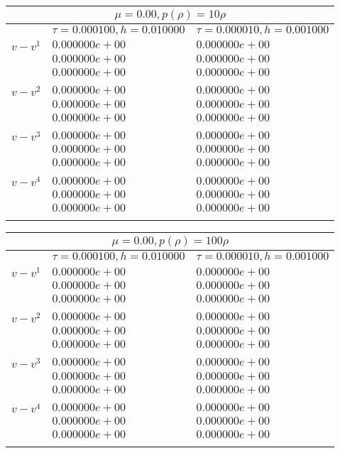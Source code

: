 \documentclass[12pt,a4paper]{article}
\begin{document}
\begin{tabular}{ |l|l|l|}
\hline
\multicolumn{3}{|c|}{$\mu = 0.00, p(\rho) = 10\rho$} \\
\hline
 &$\tau = 0.000100, h = 0.010000$ &$\tau = 0.000010, h = 0.001000$ \\
\hline
$v-v^{1}$& $0.000000e+00$ & $0.000000e+00$ \\
& $0.000000e+00$ & $0.000000e+00$ \\
& $0.000000e+00$ & $0.000000e+00$ \\
\\
\hline
$v-v^{2}$& $0.000000e+00$ & $0.000000e+00$ \\
& $0.000000e+00$ & $0.000000e+00$ \\
& $0.000000e+00$ & $0.000000e+00$ \\
\\
\hline
$v-v^{3}$& $0.000000e+00$ & $0.000000e+00$ \\
& $0.000000e+00$ & $0.000000e+00$ \\
& $0.000000e+00$ & $0.000000e+00$ \\
\\
\hline
$v-v^{4}$& $0.000000e+00$ & $0.000000e+00$ \\
& $0.000000e+00$ & $0.000000e+00$ \\
& $0.000000e+00$ & $0.000000e+00$ \\
\\
\hline
\end{tabular}

\begin{tabular}{ |l|l|l|}
\hline
\multicolumn{3}{|c|}{$\mu = 0.00, p(\rho) = 100\rho$} \\
\hline
 &$\tau = 0.000100, h = 0.010000$ &$\tau = 0.000010, h = 0.001000$ \\
\hline
$v-v^{1}$& $0.000000e+00$ & $0.000000e+00$ \\
& $0.000000e+00$ & $0.000000e+00$ \\
& $0.000000e+00$ & $0.000000e+00$ \\
\\
\hline
$v-v^{2}$& $0.000000e+00$ & $0.000000e+00$ \\
& $0.000000e+00$ & $0.000000e+00$ \\
& $0.000000e+00$ & $0.000000e+00$ \\
\\
\hline
$v-v^{3}$& $0.000000e+00$ & $0.000000e+00$ \\
& $0.000000e+00$ & $0.000000e+00$ \\
& $0.000000e+00$ & $0.000000e+00$ \\
\\
\hline
$v-v^{4}$& $0.000000e+00$ & $0.000000e+00$ \\
& $0.000000e+00$ & $0.000000e+00$ \\
& $0.000000e+00$ & $0.000000e+00$ \\
\\
\hline
\end{tabular}
\end{document}
